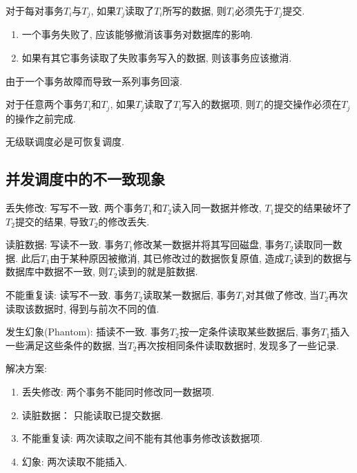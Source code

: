\begin{definition}[可恢复调度]
  对于每对事务$T_i$与$T_j$, 如果$T_j$读取了$T_i$所写的数据, 则$T_i$必须先于$T_j$提交.
  \begin{enumerate}
      \item 一个事务失败了, 应该能够撤消该事务对数据库的影响.
      \item 如果有其它事务读取了失败事务写入的数据, 则该事务应该撤消.
  \end{enumerate}
\end{definition}

\begin{definition}[级联调度]
  由于一个事务故障而导致一系列事务回滚.
\end{definition}

\begin{definition}[无级连调度]
  对于任意两个事务$T_i$和$T_j$, 如果$T_j$读取了$T_i$写入的数据项, 则$T_i$的提交操作必须在$T_j$的操作之前完成.

  无级联调度必是可恢复调度.
\end{definition}

\subsection{并发调度中的不一致现象}

丢失修改: 写写不一致. 两个事务$T_1$和$T_2$读入同一数据并修改, 
$T_1$提交的结果破坏了$T_2$提交的结果, 导致$T_2$的修改丢失.

读脏数据: 写读不一致. 事务$T_1$修改某一数据并将其写回磁盘, 
事务$T_2$读取同一数据. 
此后$T_1$由于某种原因被撤消, 其已修改过的数据恢复原值, 
造成$T_2$读到的数据与数据库中数据不一致, 则$T_2$读到的就是脏数据.

不能重复读: 读写不一致. 事务$T_2$读取某一数据后, 事务$T_1$对其做了修改, 
当$T_2$再次读取该数据时, 得到与前次不同的值.

发生幻象(Phantom): 插读不一致. 事务$T_2$按一定条件读取某些数据后, 
事务$T_1$插入一些满足这些条件的数据, 
当$T_2$再次按相同条件读取数据时, 发现多了一些记录.

解决方案:
\begin{enumerate}
    \item 丢失修改: 两个事务不能同时修改同一数据项.
    \item 读脏数据： 只能读取已提交数据.
    \item 不能重复读: 两次读取之间不能有其他事务修改该数据项.
    \item 幻象: 两次读取不能插入.
\end{enumerate}

